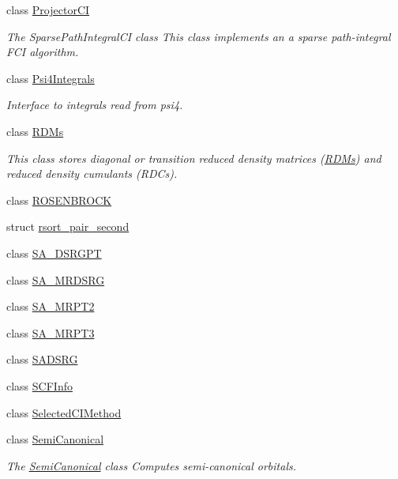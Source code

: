 \begin{DoxyCompactItemize}
class \mbox{\hyperlink{classforte_1_1_projector_c_i}{Projector\+CI}}
\begin{DoxyCompactList}\small\item\em The Sparse\+Path\+Integral\+CI class This class implements an a sparse path-\/integral F\+CI algorithm. \end{DoxyCompactList}\item 
class \mbox{\hyperlink{classforte_1_1_psi4_integrals}{Psi4\+Integrals}}
\begin{DoxyCompactList}\small\item\em Interface to integrals read from psi4. \end{DoxyCompactList}\item 
class \mbox{\hyperlink{classforte_1_1_r_d_ms}{R\+D\+Ms}}
\begin{DoxyCompactList}\small\item\em This class stores diagonal or transition reduced density matrices (\mbox{\hyperlink{classforte_1_1_r_d_ms}{R\+D\+Ms}}) and reduced density cumulants (R\+D\+Cs). \end{DoxyCompactList}\item 
class \mbox{\hyperlink{classforte_1_1_r_o_s_e_n_b_r_o_c_k}{R\+O\+S\+E\+N\+B\+R\+O\+CK}}
\item 
struct \mbox{\hyperlink{structforte_1_1rsort__pair__second}{rsort\+\_\+pair\+\_\+second}}
\item 
class \mbox{\hyperlink{classforte_1_1_s_a___d_s_r_g_p_t}{S\+A\+\_\+\+D\+S\+R\+G\+PT}}
\item 
class \mbox{\hyperlink{classforte_1_1_s_a___m_r_d_s_r_g}{S\+A\+\_\+\+M\+R\+D\+S\+RG}}
\item 
class \mbox{\hyperlink{classforte_1_1_s_a___m_r_p_t2}{S\+A\+\_\+\+M\+R\+P\+T2}}
\item 
class \mbox{\hyperlink{classforte_1_1_s_a___m_r_p_t3}{S\+A\+\_\+\+M\+R\+P\+T3}}
\item 
class \mbox{\hyperlink{classforte_1_1_s_a_d_s_r_g}{S\+A\+D\+S\+RG}}
\item 
class \mbox{\hyperlink{classforte_1_1_s_c_f_info}{S\+C\+F\+Info}}
\item 
class \mbox{\hyperlink{classforte_1_1_selected_c_i_method}{Selected\+C\+I\+Method}}
\item 
class \mbox{\hyperlink{classforte_1_1_semi_canonical}{Semi\+Canonical}}
\begin{DoxyCompactList}\small\item\em The \mbox{\hyperlink{classforte_1_1_semi_canonical}{Semi\+Canonical}} class Computes semi-\/canonical orbitals. \end{DoxyCompactList}\item 

\end{DoxyCompactItemize}
